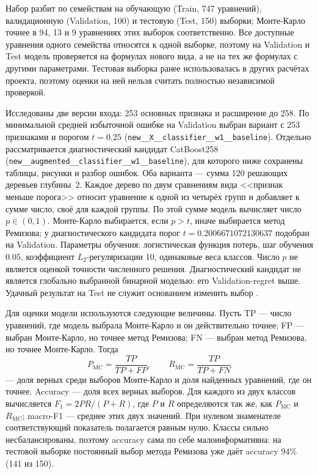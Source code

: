\documentclass[14pt,a4paper]{extarticle}
\DeclareRobustCommand{\code}[1]{\texttt{\let\savedunderscore\_\def\_{\savedunderscore\allowbreak}#1}}
\begin{document}
Набор разбит по семействам на обучающую (Train, 747 уравнений),
валидационную (Validation, 100) и тестовую (Test, 150) выборки;
Монте-Карло точнее в 94, 13 и 9 уравнениях этих выборок соответственно.
Все доступные уравнения одного семейства относятся к одной выборке, поэтому
на Validation и Test модель проверяется на формулах нового вида,
а не на тех же формулах с другими параметрами. Тестовая выборка ранее
использовалась в других расчётах проекта, поэтому оценки на ней нельзя
считать полностью независимой проверкой.

Исследованы две версии входа: 253 основных признака и расширение
до 258. По минимальной средней избыточной ошибке на Validation
выбран вариант с 253 признаками и порогом $t=0.25$
(\code{new\_\_X\_\_classifier\_\_w1\_\_baseline}).
Отдельно рассматривается диагностический кандидат CatBoost258
(\code{new\_\_augmented\_\_classifier\_\_w1\_\_baseline}),
для которого ниже сохранены таблицы, рисунки и разбор ошибок.
Оба варианта --- сумма 120 решающих деревьев глубины~2.
Каждое дерево по двум сравнениям вида <<признак меньше порога>> относит
уравнение к одной из четырёх групп и добавляет к сумме число, своё
для каждой группы. По этой сумме модель вычисляет число $p\in(0,1)$.
Монте-Карло выбирается, если $p>t$, иначе выбирается метод Ремизова;
у диагностического кандидата порог
$t=0.2006671072130637$ подобран на Validation. Параметры обучения:
логистическая функция потерь, шаг обучения $0.05$, коэффициент
$L_2$-регуляризации 10, одинаковые веса классов. Число $p$ не является
оценкой точности численного решения. Диагностический кандидат
не является глобально выбранной бинарной моделью: его Validation-regret
выше. Удачный результат на Test не служит основанием изменить выбор
\cite{savedmodels}.

Для оценки модели используются следующие величины. Пусть TP --- число
уравнений, где модель выбрала Монте-Карло и он действительно точнее;
FP --- выбран Монте-Карло, но точнее метод Ремизова; FN --- выбран метод
Ремизова, но точнее Монте-Карло. Тогда
\[
P_{\mathrm{MC}}=\frac{TP}{TP+FP},\qquad R_{\mathrm{MC}}=\frac{TP}{TP+FN}
\]
--- доля верных среди выборов Монте-Карло и доля найденных уравнений,
где он точнее. Accuracy --- доля всех верных выборов. Для каждого
из двух классов вычисляется $F_1=2PR/(P+R)$, где $P$ и $R$ определяются
так же, как $P_{\mathrm{MC}}$ и $R_{\mathrm{MC}}$; macro-F1 --- среднее
этих двух значений. При нулевом знаменателе соответствующий
показатель полагается равным нулю. Классы сильно несбалансированы,
поэтому accuracy
сама по себе малоинформативна: на тестовой выборке постоянный выбор
метода Ремизова уже даёт accuracy 94\% (141 из 150).
\end{document}
